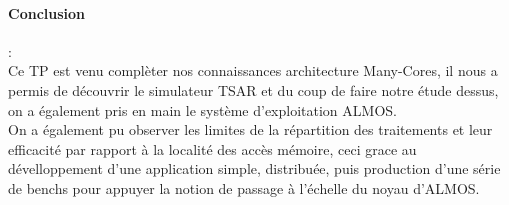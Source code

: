 \paragraph{Conclusion}:\\

Ce TP est venu complèter nos connaissances architecture Many-Cores, il nous a permis de découvrir le
simulateur TSAR et du coup de faire notre étude dessus, on a également pris en main le système d'exploitation ALMOS.\\

On a également pu observer les limites de la répartition des traitements et leur efficacité par
rapport à la localité des accès mémoire, ceci grace au dévelloppement d'une application simple,
 distribuée, puis production d'une série de benchs pour appuyer la notion de passage à l'échelle
 du noyau d'ALMOS.\\
